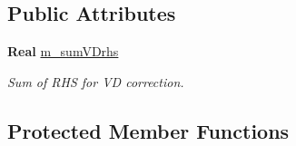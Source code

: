 \subsection*{Public Attributes}
\begin{DoxyCompactItemize}
\item 
\mbox{\label{class_projector_ad17387c22fc3e2ad197e9d53460bbf05}} 
\textbf{ Real} \hyperlink{class_projector_ad17387c22fc3e2ad197e9d53460bbf05}{m\+\_\+sum\+V\+Drhs}
\begin{DoxyCompactList}\small\item\em Sum of R\+HS for VD correction. \end{DoxyCompactList}\end{DoxyCompactItemize}
\subsection*{Protected Member Functions}
